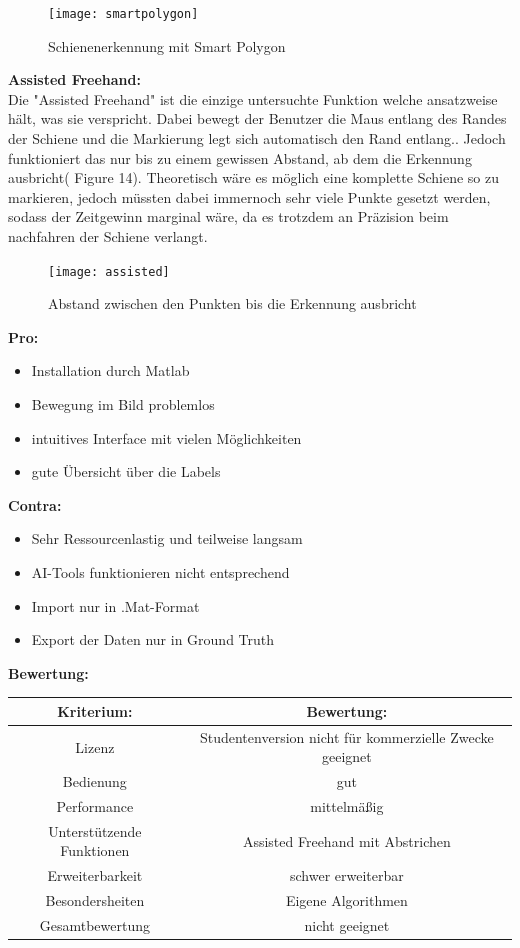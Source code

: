 \documentclass[11pt]{scrartcl}
\begin{document}
\begin{figure}[H]
  \texttt{[image: smartpolygon]}
  \caption{Schienenerkennung mit Smart Polygon}
\end{figure}

\noindent
\textbf{Assisted Freehand:}
\\

 \noindent
Die "Assisted Freehand" ist die einzige untersuchte Funktion welche ansatzweise hält, was sie verspricht. Dabei bewegt der Benutzer die Maus entlang des Randes der Schiene und die Markierung legt sich automatisch den Rand entlang.. Jedoch funktioniert das nur bis zu einem gewissen Abstand, ab dem die Erkennung ausbricht( Figure 14). Theoretisch wäre es möglich eine komplette Schiene so zu markieren, jedoch müssten dabei immernoch sehr viele Punkte gesetzt werden, sodass der Zeitgewinn marginal wäre, da es trotzdem an Präzision beim nachfahren der Schiene verlangt.

\begin{figure}[H]
  \texttt{[image: assisted]}
  \caption{Abstand zwischen den Punkten bis die Erkennung ausbricht}
\end{figure}

\textbf{Pro:} 
\begin{itemize}
	\item Installation durch Matlab
	\item Bewegung im Bild problemlos
	\item intuitives Interface mit vielen Möglichkeiten
	\item gute Übersicht über die Labels
\end{itemize}
\textbf{Contra:} 
\begin{itemize}
	\item Sehr Ressourcenlastig und teilweise langsam
	\item AI-Tools funktionieren nicht entsprechend
	\item Import nur in .Mat-Format
	\item Export der Daten nur in Ground Truth
\end{itemize}

\noindent
\textbf{Bewertung:}
\\

\noindent 
\begin{tabular}[h]{c|c}
Kriterium: & Bewertung:\\
\hline
Lizenz & Studentenversion nicht für kommerzielle Zwecke geeignet\\
Bedienung & gut\\
Performance & mittelmäßig\\
Unterstützende Funktionen & Assisted Freehand mit Abstrichen\\
Erweiterbarkeit & schwer erweiterbar\\
Besondersheiten & Eigene Algorithmen\\
\hline
Gesamtbewertung & nicht geeignet\\
\end{tabular}
\end{document}
